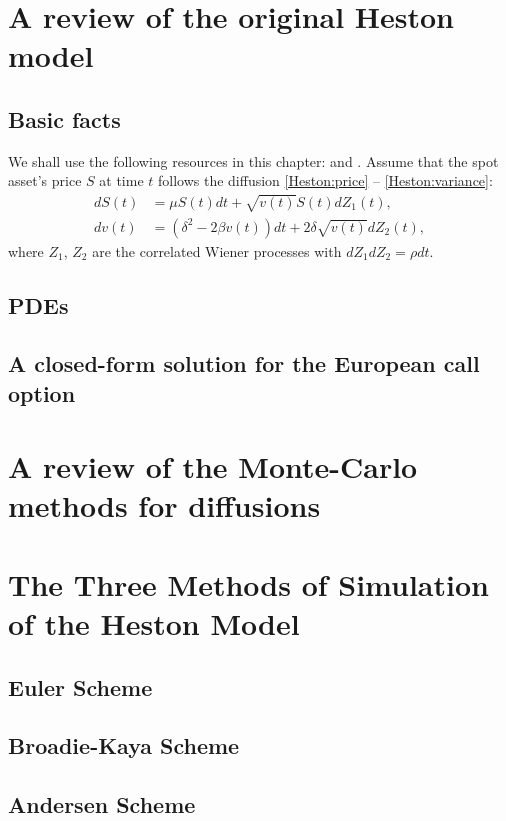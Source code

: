 \chapter{A review of the original Heston model}
    \section{Basic facts}
        We shall use the following resources in this chapter: \cite{Heston1993} and \cite{Gatheral2012}.
        Assume that the spot asset's price $S$ at time $t$ follows the diffusion \eqref{Heston:price} -- \eqref{Heston:variance}:
        \begin{align}
            dS(t) & = \mu S(t)dt + \sqrt{v(t)} S(t) dZ_1(t), \label{Heston:price}\\
            dv(t) & = \left(\delta^2 - 2\beta v(t)\right) dt + 2\delta \sqrt{v(t)} dZ_2(t), \label{Heston:variance}
        \end{align}
        where $Z_1$, $Z_2$ are the correlated Wiener processes with $dZ_1dZ_2 = \rho dt$.
    \section{PDEs}
    \section{A closed-form solution for the European call option}
\chapter{A review of the Monte-Carlo methods for diffusions}

\chapter{The Three Methods of Simulation of the Heston Model}
    \section{Euler Scheme}

    \section{Broadie-Kaya Scheme}

    \section{Andersen Scheme}

